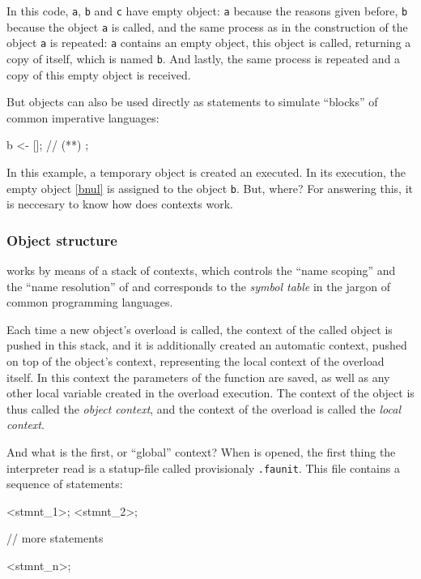 \documentclass{article}
\begin{document}
In this code, \texttt{a}, \texttt{b} and \texttt{c} have empty object:
\texttt{a} because the reasons given before, \texttt{b} because the object
\texttt{a} is called, and the same process as in the construction of the object
\texttt{a} is repeated: \texttt{a} contains an empty object, this object is
called, returning a copy of itself, which is named \texttt{b}. And lastly, the
same process is repeated and a copy of this empty object is received.

But objects can also be used directly as statements to simulate ``blocks'' of
common imperative languages:

\begin{faupp2}
  {
    b <- []; // (*\label{bnul}*)
  };
\end{faupp2}

In this example, a temporary object is created an executed. In its execution,
the empty object \ref{bnul} is assigned to the object \texttt{b}. But, where?
For answering this, it is neccesary to know how does contexts work.

\subsubsection{Object structure}
\ffaupp works by means of a stack of contexts, which controls the ``name
scoping'' and the ``name resolution'' of \faupp and corresponds to the
\textit{symbol table} in the jargon of common programming languages.

Each time a new object's overload is called, the context of the called object is
pushed in this stack, and it is additionally created an automatic context,
pushed on top of the object's context, representing the local context of the
overload itself. In this context the parameters of the function are saved, as
well as any other local variable created in the overload execution. The context
of the object is thus called the \textit{object context}, and the context of the
overload is called the \textit{local context}.

And what is the first, or ``global'' context? When \fav is opened, the first
thing the interpreter read is a statup-file called provisionaly
\texttt{.faunit}. This file contains a sequence of statements:

\begin{faupp2}
  <stmnt_1>;
  <stmnt_2>;

  // more statements

  <stmnt_n>;
\end{faupp2}
\end{document}
